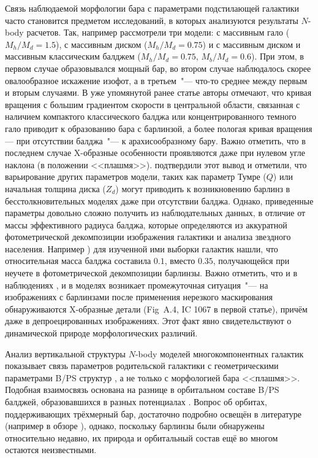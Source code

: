\documentclass{trlnotes}
\begin{document}
Связь наблюдаемой морфологии бара с параметрами подстилающей галактики часто становится предметом исследований, в которых 
анализуются результаты $N$-body расчетов. Так, например \citet{athanassoula2002}  рассмотрели три модели: с массивным гало 
($M_h/M_d = 1.5$), с массивным диском ($M_h/M_d = 0.75$) и с массивным диском и массивным классическим балджем 
($M_h/M_d = 0.75$, $M_b/M_d = 0.6$). При этом, в первом случае образовывался мощный  бар, во втором случае наблюдалось скорее овалообразное искажение изофот, а в третьем~"--- что-то среднее между первым и вторым случаями. В уже упомянутой ранее 
статье \cite{salo2017} авторы отмечают, что кривая вращения с большим градиентом скорости в центральной области, связанная с наличием компактого классического 
балджа или концентрированного темного гало приводит к образованию бара с барлинзой, а более пологая кривая вращения --- при отсутствии балджа~"--- к арахисообразному бару. Важно отметить, что в последнем случае X-образные особенности проявляются даже при нулевом угле наклона (в положении <<плашмя>>).  
\citet{smirnov2018} подтвердили этот вывод и отметили, что варьирование других параметров модели, таких как 
параметр Тумре ($Q$) или начальная толщина диска ($Z_d$) могут приводить к возникновению барлинз в 
бесстолкновительных моделях даже при отсутствии балджа. Однако, приведенные параметры довольно сложно получить из наблюдательных 
данных, в отличие от массы эффективного радиуса балджа, которые определяются из  аккуратной фотометрической декомпозиции 
изображения галактики и анализа звездного населения. Например \citet{laurikainen2014}) для изученной ими выборки галактик нашли, что относительная масса балджа составила
$0.1$, вместо $0.35$, получающейся при неучете в фотометрической декомпозиции  барлинзы. Важно отметить, что и в наблюдениях
\citep{laurikainen2017}, и в моделях \citep{salo2017} возникает промежуточная ситуация~"--- на изображениях с
барлинзами после применения нерезкого маскирования обнаруживаются X-образные детали (Fig~A.4, IC 1067 в первой
статье), причём даже в депроецированных изображениях. Этот факт явно свидетельствуют о динамической природе
морфологических различий. 

Анализ вертикальной структуры $N$-body моделей многокомпонентных галактик показывает связь параметров родительской
галактики с геометрическими параметрами B/PS структур \citep{smirnov2018}, а не только с морфологией бара
<<плашмя>>. Подобная взаимосвязь основана на разнице в орбитальном составе B/PS балджей, образовавшихся в разных
потенциалах \citep{parul2020}. Вопрос об орбитах, поддерживающих трёхмерный бар, достаточно подробно освещён в
литературе (например в обзоре \cite{athanassoula2016}), однако, поскольку барлинзы были обнаружены относительно
недавно, их природа и орбитальный состав ещё во многом остаются неизвестными. 
\end{document}
